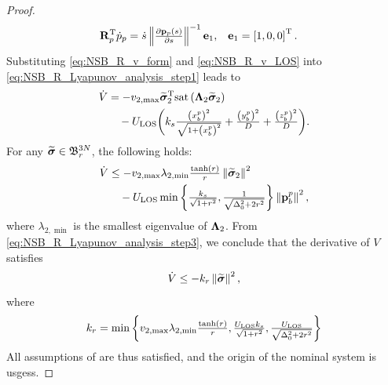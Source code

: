 \begin{proof}
    \begin{align}
        \mat{R}_p\T\dot{p}_p &= \dot{s}\norm{\scale[1]{\frac{\partial \mat{p}_p(s)}{\partial s}}}^{-1}\mat{e}_1, &
        \mat{e}_1 &= \inlinevector{1, 0, 0}.
    \end{align}
    Substituting \eqref{eq:NSB_R_v_form} and \eqref{eq:NSB_R_v_LOS} into \eqref{eq:NSB_R_Lyapunov_analysis_step1} leads to 
    \begin{equation}
        \begin{split}
        \dot{V} &= -\ivels_{2, \rm max} \widetilde{\bs{\sigma}}_2\T {\rm sat}\left(\bs{\Lambda}_2\widetilde{\bs{\sigma}}_2\right) \\
                &\quad -U_{\rm LOS} \scale[1]{\left(
                    k_{s}\frac{\left(x_b^p\right)^2}{\sqrt{1 + \left(x_b^p\right)^2}} +
                    \frac{\left(y_b^p\right)^2}{D} +
                    \frac{\left(z_b^p\right)^2}{D}
                  \right)}.
        \end{split}
        \label{eq:NSB_R_Lyapunov_analysis_step2}
    \end{equation}
    For any $\widetilde{\bs{\sigma}} \in \ball[3N]{r}$, the following holds: 
    \begin{equation}
        \begin{split}
        \dot{V} &\leq  - \ivels_{2, \max}\lambda_{2, \min}\scale[1]{\frac{{\rm tanh}(r)}{r}}\norm{\widetilde{\bs{\sigma}}_2}^2 \\
                &\quad - U_{\rm LOS}\min\left\{\scale[1]{\frac{k_{s}}{\sqrt{1+r^2}}, \frac{1}{\sqrt{\Delta_0^2+2r^2}}}\right\}\norm{\mat{p}_b^p}^2,
        \end{split}
        \label{eq:NSB_R_Lyapunov_analysis_step3}
    \end{equation}
    where $\lambda_{2, \min}$ is the smallest eigenvalue of $\bs{\Lambda}_2$.
    From \eqref{eq:NSB_R_Lyapunov_analysis_step3}, we conclude that the derivative of $V$ satisfies
    \begin{equation}
        \dot{V} \leq - k_r \norm{\widetilde{\bs{\sigma}}}^2,
    \end{equation}
    where
    \begin{equation}
        k_r = \min \left\{\ivels_{2, \max}\lambda_{2, \min}\scale[1]{\frac{{\rm tanh}(r)}{r}}, 
                          \scale[1]{\frac{U_{\rm LOS}k_{s}}{\sqrt{1+r^2}}}, 
                          \scale[1]{\frac{U_{\rm LOS}}{\sqrt{\Delta_0^2+2r^2}}}\right\}
    \end{equation}
    All assumptions of \cite[Theorem 5]{pettersen_lyapunov_2017} are thus satisfied, and the origin of the nominal system is \glspl{usges}.


\end{proof}
